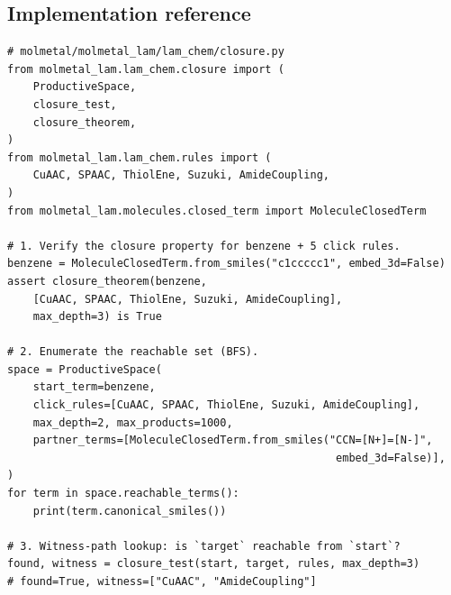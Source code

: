 \subsection{Implementation reference}
\label{sec:closure-implementation}

\begin{verbatim}
# molmetal/molmetal_lam/lam_chem/closure.py
from molmetal_lam.lam_chem.closure import (
    ProductiveSpace,
    closure_test,
    closure_theorem,
)
from molmetal_lam.lam_chem.rules import (
    CuAAC, SPAAC, ThiolEne, Suzuki, AmideCoupling,
)
from molmetal_lam.molecules.closed_term import MoleculeClosedTerm

# 1. Verify the closure property for benzene + 5 click rules.
benzene = MoleculeClosedTerm.from_smiles("c1ccccc1", embed_3d=False)
assert closure_theorem(benzene,
    [CuAAC, SPAAC, ThiolEne, Suzuki, AmideCoupling],
    max_depth=3) is True

# 2. Enumerate the reachable set (BFS).
space = ProductiveSpace(
    start_term=benzene,
    click_rules=[CuAAC, SPAAC, ThiolEne, Suzuki, AmideCoupling],
    max_depth=2, max_products=1000,
    partner_terms=[MoleculeClosedTerm.from_smiles("CCN=[N+]=[N-]",
                                                   embed_3d=False)],
)
for term in space.reachable_terms():
    print(term.canonical_smiles())

# 3. Witness-path lookup: is `target` reachable from `start`?
found, witness = closure_test(start, target, rules, max_depth=3)
# found=True, witness=["CuAAC", "AmideCoupling"]
\end{verbatim}

